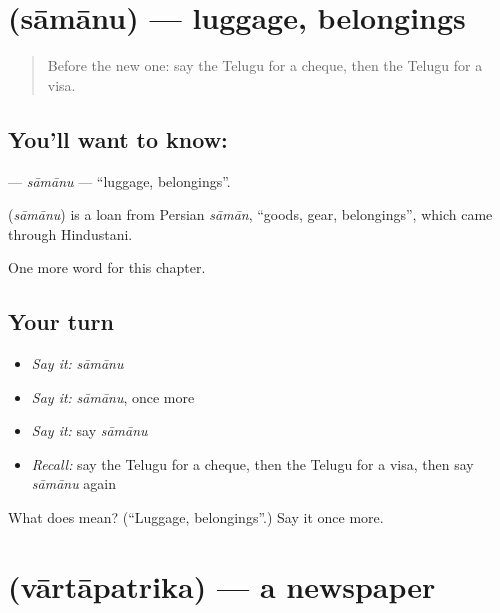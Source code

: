 \section[\texorpdfstring{\te{సామాను} (sāmānu)}{సామాను (sāmānu)}]{ (sāmānu) — luggage, belongings}

\label{lesson:TE-C264-samanu}



\begin{quote}
Before the new one: say the Telugu for a cheque, then the Telugu for a visa.
\end{quote}

\subsection*{You'll want to know: }
\textbf{} — \emph{sāmānu} — \textquotedblleft{}luggage, belongings\textquotedblright{}.

\begin{cousinweb}
\textbf{} (\emph{sāmānu}) is a loan from Persian \emph{sāmān}, \textquotedblleft{}goods, gear, belongings\textquotedblright{}, which came through Hindustani.
\end{cousinweb}

\begin{grammarlens}[title={What you've built}]
One more word for this chapter.
\end{grammarlens}

\subsection*{Your turn}
\begin{itemize}
\raggedright
  \item \emph{Say it:} \emph{sāmānu}
  \item \emph{Say it:} \emph{sāmānu}, once more
  \item \emph{Say it:} say \emph{sāmānu}
  \item \emph{Recall:} say the Telugu for a cheque, then the Telugu for a visa, then say \emph{sāmānu} again
\end{itemize}

\begin{tcolorbox}[breakable,colback=teal!4,colframe=teal!35!black,title={Before you move on}]
What does  mean? (\textquotedblleft{}Luggage, belongings\textquotedblright{}.) Say it once more.
\end{tcolorbox}
\section[\texorpdfstring{\te{వార్తాపత్రిక} (vārtāpatrika)}{వార్తాపత్రిక (vārtāpatrika)}]{ (vārtāpatrika) — a newspaper}

